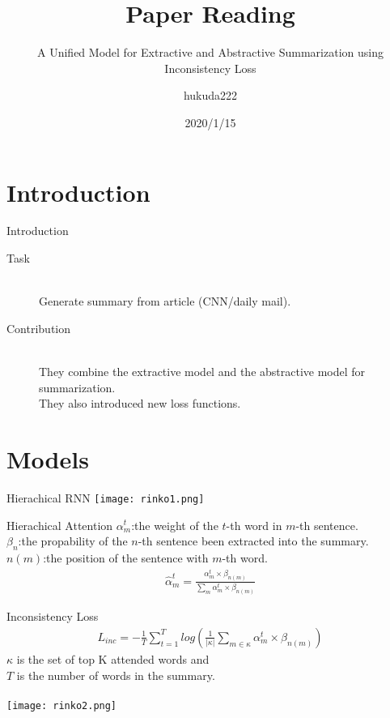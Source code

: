 \documentclass[17pt, unicode,dvipdfmx]{beamer}
\title{Paper Reading}
\subtitle{ A Unified Model for Extractive and Abstractive Summarization using Inconsistency Loss}
\author{hukuda222}
\date{2020/1/15}
\begin{document}
\frame[plain]{\maketitle}

\begin{frame}{}
 \tableofcontents
\end{frame}

\section{Introduction}
\begin{frame}{Introduction}
    \begin{description}
      \item [Task]~\\ Generate summary from article (CNN/daily mail).
      \item [Contribution] ~\\They combine the extractive model and the abstractive model for summarization.\\
        They also introduced new loss functions.
  \end{description}
\end{frame}

\section{Models}
\begin{frame}{Hierachical RNN}
\texttt{[image: rinko1.png]}
\end{frame}

\begin{frame}{Hierachical Attention}
  \small
  $\alpha_m^t$:the weight of the $t$-th word in $m$-th sentence.\\
  $\beta_n$:the propability of the $n$-th sentence been extracted into the summary.\\
  $n(m)$:the position of the sentence with $m$-th word.
  \normalsize
  \begin{align}
    \hat{\alpha}_m^t=\frac{\alpha^t_m\times \beta_{n(m)}}{\sum_m\alpha^t_m\times \beta_{n(m)}}
  \end{align}
\end{frame}


\begin{frame}{Inconsistency Loss}
  \small
  \begin{align}
    L_{inc}=-\frac{1}{T}\sum_{t=1}^T log(\frac{1}{|\kappa|} \sum_{m\in \kappa}\alpha^t_m\times \beta_{n(m)})
  \end{align}
  $\kappa$ is the set of top K attended words and\\ $T$ is the number of words in the summary.\\~\\
\texttt{[image: rinko2.png]}
\end{frame}
\end{document}
